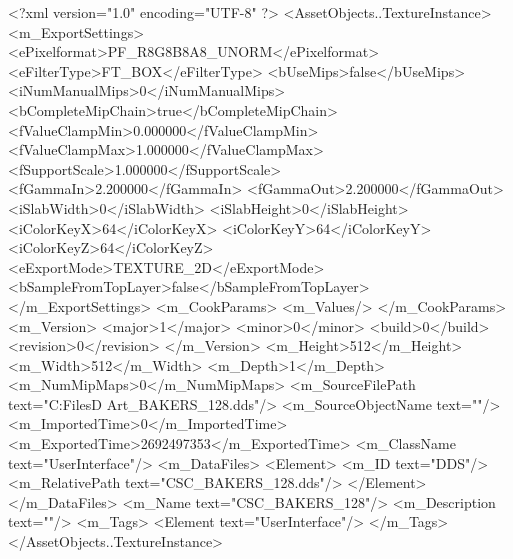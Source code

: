 <?xml version="1.0" encoding="UTF-8" ?>
<AssetObjects..TextureInstance>
	<m_ExportSettings>
		<ePixelformat>PF_R8G8B8A8_UNORM</ePixelformat>
		<eFilterType>FT_BOX</eFilterType>
		<bUseMips>false</bUseMips>
		<iNumManualMips>0</iNumManualMips>
		<bCompleteMipChain>true</bCompleteMipChain>
		<fValueClampMin>0.000000</fValueClampMin>
		<fValueClampMax>1.000000</fValueClampMax>
		<fSupportScale>1.000000</fSupportScale>
		<fGammaIn>2.200000</fGammaIn>
		<fGammaOut>2.200000</fGammaOut>
		<iSlabWidth>0</iSlabWidth>
		<iSlabHeight>0</iSlabHeight>
		<iColorKeyX>64</iColorKeyX>
		<iColorKeyY>64</iColorKeyY>
		<iColorKeyZ>64</iColorKeyZ>
		<eExportMode>TEXTURE_2D</eExportMode>
		<bSampleFromTopLayer>false</bSampleFromTopLayer>
	</m_ExportSettings>
	<m_CookParams>
		<m_Values/>
	</m_CookParams>
	<m_Version>
		<major>1</major>
		<minor>0</minor>
		<build>0</build>
		<revision>0</revision>
	</m_Version>
	<m_Height>512</m_Height>
	<m_Width>512</m_Width>
	<m_Depth>1</m_Depth>
	<m_NumMipMaps>0</m_NumMipMaps>
	<m_SourceFilePath text="C:\Users\Shadow\Desktop\Working Files\2D Art\Quarters\Bakers\CSC_BAKERS_128.dds"/>
	<m_SourceObjectName text=""/>
	<m_ImportedTime>0</m_ImportedTime>
	<m_ExportedTime>2692497353</m_ExportedTime>
	<m_ClassName text="UserInterface"/>
	<m_DataFiles>
		<Element>
			<m_ID text="DDS"/>
			<m_RelativePath text="CSC_BAKERS_128.dds"/>
		</Element>
	</m_DataFiles>
	<m_Name text="CSC_BAKERS_128"/>
	<m_Description text=""/>
	<m_Tags>
		<Element text="UserInterface"/>
	</m_Tags>
</AssetObjects..TextureInstance>

